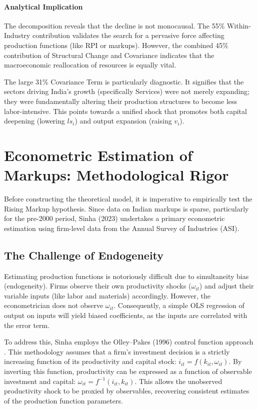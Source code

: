 \documentclass[12pt]{article}
\begin{document}
\bigskip

\paragraph{Analytical Implication}
The decomposition reveals that the decline is not monocausal. The 55\% Within-Industry contribution validates the search for a pervasive force affecting production functions (like RPI or markups). However, the combined 45\% contribution of Structural Change and Covariance indicates that the macroeconomic reallocation of resources is equally vital.

The large 31\% Covariance Term is particularly diagnostic. It signifies that the sectors driving India’s growth (specifically Services) were not merely expanding; they were fundamentally altering their production structures to become less labor-intensive. This points towards a unified shock that promotes both capital deepening (lowering $ls_i$) and output expansion (raising $v_i$).

\newpage
\section{Econometric Estimation of Markups: Methodological Rigor}

Before constructing the theoretical model, it is imperative to empirically test the Rising Markup hypothesis. Since data on Indian markups is sparse, particularly for the pre-2000 period, Sinha (2023) undertakes a primary econometric estimation using firm-level data from the Annual Survey of Industries (ASI).

\subsection{The Challenge of Endogeneity}
Estimating production functions is notoriously difficult due to simultaneity bias (endogeneity). Firms observe their own productivity shocks ($\omega_{it}$) and adjust their variable inputs (like labor and materials) accordingly. However, the econometrician does not observe $\omega_{it}$. Consequently, a simple OLS regression of output on inputs will yield biased coefficients, as the inputs are correlated with the error term.

To address this, Sinha employs the Olley–Pakes (1996) control function approach \citep{OlleyPakes1996}. This methodology assumes that a firm's investment decision is a strictly increasing function of its productivity and capital stock: $i_{it} = f(k_{it}, \omega_{it})$. By inverting this function, productivity can be expressed as a function of observable investment and capital: $\omega_{it} = f^{-1}(i_{it}, k_{it})$. This allows the unobserved productivity shock to be proxied by observables, recovering consistent estimates of the production function parameters.
\end{document}
